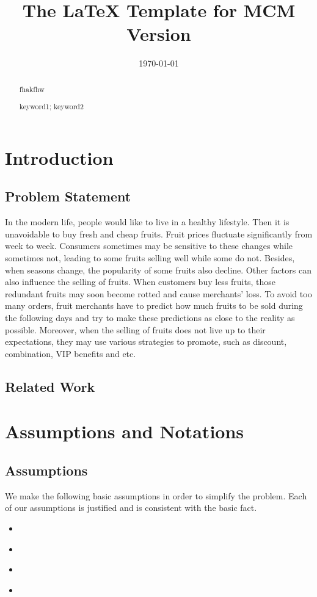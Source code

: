 \documentclass{mcmthesis}
\title{The \LaTeX{} Template for MCM Version \MCMversion}
\author{}
\date{\today}
\begin{document}
\begin{abstract}
fhakfhw
\begin{keywords}
keyword1; keyword2
\end{keywords}
\end{abstract}
\maketitle
\tableofcontents

\newpage
\section{Introduction}

\subsection{Problem Statement}
In the modern life, people would like to live in a healthy lifestyle. Then it is unavoidable to buy fresh and cheap fruits. Fruit prices fluctuate significantly from week to week. Consumers sometimes may be sensitive to these changes while sometimes not, leading to some fruits selling well while some do not. Besides, when seasons change, the popularity of some fruits also decline. Other factors can also influence the selling of fruits. When customers buy less fruits, those redundant fruits may soon become rotted and cause merchants’ loss. To avoid too many orders, fruit merchants have to predict how much fruits to be sold during the following days and try to make these predictions as close to the reality as possible. Moreover, when the selling of fruits does not live up to their expectations, they may use various strategies to promote, such as discount, combination, VIP benefits and etc.
\subsection{Related Work}

\section{Assumptions and Notations}

\subsection{Assumptions}
We make the following basic assumptions in order to simplify the problem. Each
of our assumptions is justified and is consistent with the basic fact.
\begin{itemize}
\item \textbf{}
\item \textbf{}
\item \textbf{}
\item \textbf{}
\end{itemize}
\end{document}
